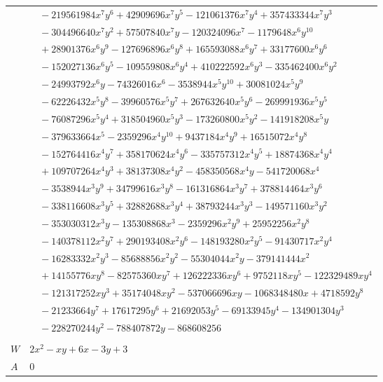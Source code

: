 \documentclass[11pt]{article}
\begin{document}
\begin{longtable}{@{}ll@{}}
 & $\quad -219561984x^{7}y^{6}+42909696x^{7}y^{5}-121061376x^{7}y^{4}+357433344x^{7}y^{3}$\\
 & $\quad -304496640x^{7}y^{2}+57507840x^{7}y-120324096x^{7}-1179648x^{6}y^{10}$\\
 & $\quad +28901376x^{6}y^{9}-127696896x^{6}y^{8}+165593088x^{6}y^{7}+33177600x^{6}y^{6}$\\
 & $\quad -152027136x^{6}y^{5}-109559808x^{6}y^{4}+410222592x^{6}y^{3}-335462400x^{6}y^{2}$\\
 & $\quad -24993792x^{6}y-74326016x^{6}-3538944x^{5}y^{10}+30081024x^{5}y^{9}$\\
 & $\quad -62226432x^{5}y^{8}-39960576x^{5}y^{7}+267632640x^{5}y^{6}-269991936x^{5}y^{5}$\\
 & $\quad -76087296x^{5}y^{4}+318504960x^{5}y^{3}-173260800x^{5}y^{2}-141918208x^{5}y$\\
 & $\quad -379633664x^{5}-2359296x^{4}y^{10}+9437184x^{4}y^{9}+16515072x^{4}y^{8}$\\
 & $\quad -152764416x^{4}y^{7}+358170624x^{4}y^{6}-335757312x^{4}y^{5}+18874368x^{4}y^{4}$\\
 & $\quad +109707264x^{4}y^{3}+38137308x^{4}y^{2}-458350568x^{4}y-541720068x^{4}$\\
 & $\quad -3538944x^{3}y^{9}+34799616x^{3}y^{8}-161316864x^{3}y^{7}+378814464x^{3}y^{6}$\\
 & $\quad -338116608x^{3}y^{5}+32882688x^{3}y^{4}+38793244x^{3}y^{3}-149571160x^{3}y^{2}$\\
 & $\quad -353030312x^{3}y-135308868x^{3}-2359296x^{2}y^{9}+25952256x^{2}y^{8}$\\
 & $\quad -140378112x^{2}y^{7}+290193408x^{2}y^{6}-148193280x^{2}y^{5}-91430717x^{2}y^{4}$\\
 & $\quad -16283332x^{2}y^{3}-85688856x^{2}y^{2}-55304044x^{2}y-379141444x^{2}$\\
 & $\quad +14155776xy^{8}-82575360xy^{7}+126222336xy^{6}+9752118xy^{5}-122329489xy^{4}$\\
 & $\quad -121317252xy^{3}+35174048xy^{2}-537066696xy-1068348480x+4718592y^{8}$\\
 & $\quad -21233664y^{7}+17617295y^{6}+21692053y^{5}-69133945y^{4}-134901304y^{3}$\\
 & $\quad -228270244y^{2}-788407872y-868608256$\\
\addlinespace[3pt]
\multicolumn{2}{@{}l}{$i=77$, $m=2$, neighbours $15,73$}\\
$W$ & $2x^{2}-xy+6x-3y+3$\\
$A$ & $0$\\

\end{longtable}
\end{document}
